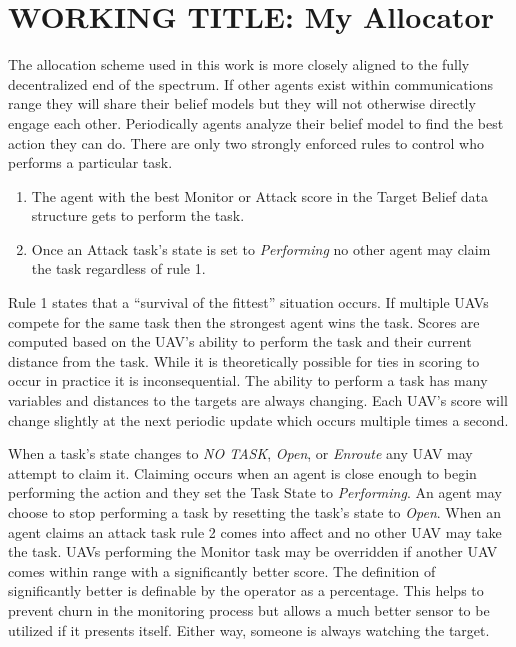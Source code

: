 \section{WORKING TITLE: My Allocator}

The allocation scheme used in this work is more closely aligned to the fully decentralized end of the spectrum.  If other agents exist within communications range they will share their belief models but they will not otherwise directly engage each other.  Periodically agents analyze their belief model to find the best action they can do.  There are only two strongly enforced rules to control who performs a particular task.  

\begin{enumerate}
	\item The agent with the best Monitor or Attack score in the Target Belief data structure gets to perform the task.
	\item Once an Attack task's state is set to \textit{Performing} no other agent may claim the task regardless of rule 1.
\end{enumerate}

Rule 1 states that a ``survival of the fittest'' situation occurs.  If multiple UAVs compete for the same task then the strongest agent wins the task.  Scores are computed based on the UAV's ability to perform the task and their current distance from the task.  While it is theoretically possible for ties in scoring to occur in practice it is inconsequential.  The ability to perform a task has many variables and distances to the targets are always changing.  Each UAV's score will change slightly at the next periodic update which occurs multiple times a second.

When a task's state changes to \textit{NO TASK}, \textit{Open}, or \textit{Enroute} any UAV may attempt to claim it.  Claiming occurs when an agent is close enough to begin performing the action and they set the Task State to \textit{Performing}.  An agent may choose to stop performing a task by resetting the task's state to \textit{Open}.  When an agent claims an attack task rule 2 comes into affect and no other UAV may take the task.  UAVs performing the Monitor task may be overridden if another UAV comes within range with a significantly better score.  The definition of significantly better is definable by the operator as a percentage.   This helps to prevent churn in the monitoring process but allows a much better sensor to be utilized if it presents itself.  Either way, someone is always watching the target.

